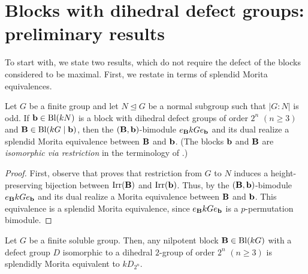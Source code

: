 \section{Blocks with dihedral defect groups: preliminary results}\label{sec:blocksWithDihedralDefectGroups}

To start with, we state two results, which do not require the defect of the blocks considered to be maximal.
First, we restate \cite[Lemma~4.1]{MacGregor22} in terms of splendid Morita equivalences.

\begin{lem}\label{lem:coveringOddIndex}%
    Let $G$ be a finite group and let $N\unlhd G$ be a normal subgroup such that $|G:N|$ is odd.  If ${\mathbf{b}}\in\operatorname{Bl}(kN)$ is a block with dihedral defect groups of order $2^n$ $(n\geq 3)$ and ${\mathbf{B}}\in \operatorname{Bl}(kG\mid {\mathbf{b}})$, then the $({\mathbf{B}},{\mathbf{b}})$-bimodule $e_{{\mathbf{B}}}kG e_{{\mathbf{b}}}$ and its dual realize a splendid Morita equivalence between ${\mathbf{B}}$ and ${\mathbf{b}}$. (The blocks ${\mathbf{b}}$ and ${\mathbf{B}}$ are \emph{isomorphic via restriction} in the terminology of \cite[Theorem~4.1 and Definition~4.3]{HidaKoshitani}.)
\end{lem}

\begin{proof}
    First, observe that \cite[Lemma~4.1]{MacGregor22} proves that restriction from $G$ to $N$ induces a height-preserving bijection between $\operatorname{Irr}({\mathbf{B}})$ and $\operatorname{Irr}({\mathbf{b}})$. Thus, by \cite[0.1 Th\'{e}or\`{e}me and 0.2 Th\'{e}or\`{e}me]{BroueIsom90} the $({\mathbf{B}},{\mathbf{b}})$-bimodule $e_{{\mathbf{B}}}kG e_{{\mathbf{b}}}$ and its dual realize a Morita equivalence between ${\mathbf{B}}$ and ${\mathbf{b}}$. This equivalence is a splendid Morita equivalence, since $e_{{\mathbf{B}}}kG e_{{\mathbf{b}}}$ is a $p$-permutation bimodule. 
\end{proof}


 \begin{lem}\label{lem: nilpotentblock}
 Let $G$ be a finite soluble group. 
 Then, any nilpotent  block ${\mathbf{B}}\in\operatorname{Bl}(kG)$ with a defect group $D$ isomorphic to a dihedral $2$-group of order $2^n$ $(n\geq 3)$  is splendidly Morita equivalent to $kD_{2^n}$.
 \end{lem}



